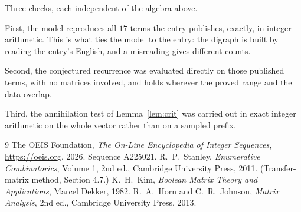 \documentclass[11pt,a4paper]{article}
\theoremstyle{plain}
\theoremstyle{definition}
\begin{document}
Three checks, each independent of the algebra above.

First, the model reproduces all $17$ terms the entry publishes, exactly, in integer
arithmetic. This is what ties the model to the entry: the digraph is built by reading the
entry's English, and a misreading gives different counts.

Second, the conjectured recurrence was evaluated directly on those published terms, with no
matrices involved, and holds wherever the proved range and the data overlap.

Third, the annihilation test of Lemma~\ref{lem:crit} was carried out in exact integer
arithmetic on the whole vector rather than on a sampled prefix.

\begin{thebibliography}{9}
 The OEIS Foundation, \emph{The On-Line Encyclopedia of Integer
Sequences}, \url{https://oeis.org}, 2026. Sequence A225021.
 R.~P.~Stanley, \emph{Enumerative Combinatorics}, Volume 1, 2nd ed.,
Cambridge University Press, 2011. (Transfer-matrix method, Section 4.7.)
 K.~H.~Kim, \emph{Boolean Matrix Theory and Applications}, Marcel Dekker,
1982.
 R.~A.~Horn and C.~R.~Johnson, \emph{Matrix Analysis}, 2nd ed., Cambridge
University Press, 2013.
\end{thebibliography}
\end{document}
